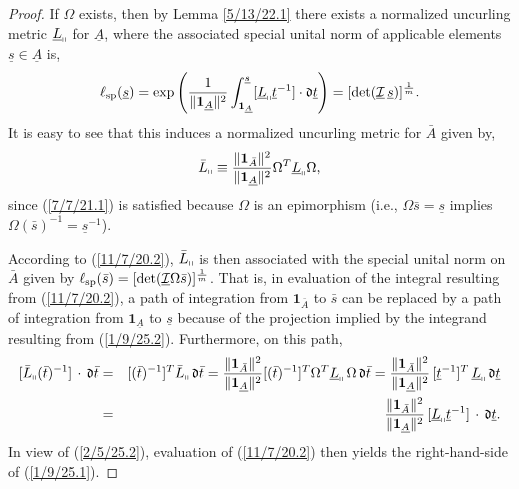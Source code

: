 \documentclass{amsart}
\numberwithin{equation}{section}
\theoremstyle{definition}
\numberwithin{theorem}{section}
\begin{document}
  \begin{proof}  
  If $\Omega$ exists, then by Lemma \ref{5/13/22.1} there exists a normalized uncurling metric $\underline{L}_{\shortparallel}$ for $\underline{A}$, where the associated special unital norm of applicable elements $\underline{s}\in \underline{A}$ is, \begin{equation}\label{1/9/25.1} \ell_{\rm sp}(\underline{s}) =    \exp\left(\frac{1}{\|\mathbf{1}_{\underline{A}}\|^2}\int_{\mathbf{1}_{\underline{A}}}^{\underline{s}} [\underline{L}_{\shortparallel}\underline{t}^{-1}]\cdot \mathfrak{d}\underline{t}\right) = [\text{det}(\underline{\mathcal{I}}\, \underline{s})]^\frac{1}{m}.\end{equation}  It is easy to see that this induces a normalized uncurling metric for $\bar{A}$ given by, 
  \begin{equation}\label{1/9/25.2} \bar{L}_{\shortparallel} \equiv \frac{\|\mathbf{1}_{\bar{A}}\|^2}{\|\mathbf{1}_{\underline{A}}\|^2} \Omega^T \underline{L}_{\shortparallel} \Omega, \end{equation} since (\ref{7/7/21.1}) is satisfied because $\Omega$ is an epimorphism (i.e., $\Omega\bar{s} =  \underline{s}$ implies $\Omega(\bar{s})^{-1} =  \underline{s}^{-1}$).
  
  According to (\ref{11/7/20.2}), $\bar{L}_{\shortparallel}$ is then associated with the special unital norm on $\bar{A}$ given by $\ell_{\rm sp}(\bar{s}) = [\text{det}(\underline{\mathcal{I}}\Omega\bar{s})]^{\frac{1}{m}}$.  That is, in evaluation of the integral resulting from  (\ref{11/7/20.2}), a path of integration from $\mathbf{1}_{\bar{A}}$ to $\bar{s}$ can be replaced by a path of integration from $\mathbf{1}_{\underline{A}}$ to $\underline{s}$ because of the projection implied by the integrand resulting from (\ref{1/9/25.2}).   Furthermore, on this path,
  \begin{eqnarray}\nonumber  [\bar{L}_{\shortparallel}(\bar{t})^{-1}]\,\cdot\, \mathfrak{d}\bar{t} &=& [(\bar{t})^{-1}]^T \bar{L}_{\shortparallel}\,\mathfrak{d}\bar{t} =  \frac{\|\mathbf{1}_{\bar{A}}\|^2}{\|\mathbf{1}_{\underline{A}}\|^2}[(\bar{t})^{-1}]^T \Omega^T \underline{L}_{\shortparallel} \, \Omega \, \mathfrak{d}\bar{t}  = \frac{\|\mathbf{1}_{\bar{A}}\|^2}{\|\mathbf{1}_{\underline{A}}\|^2}\,[\underline{t}^{-1}]^T\, \underline{L}_{\shortparallel}\,\mathfrak{d}\underline{t} \\ &=& \frac{\|\mathbf{1}_{\bar{A}}\|^2}{\|\mathbf{1}_{\underline{A}}\|^2}\,[\underline{L}_{\shortparallel}\underline{t}^{-1}]\,\cdot\, \mathfrak{d}\underline{t}.\label{2/5/25.2}\end{eqnarray}   In view of (\ref{2/5/25.2}), evaluation of (\ref{11/7/20.2}) then yields the right-hand-side of (\ref{1/9/25.1}). 
  


\end{proof}
\end{document}
